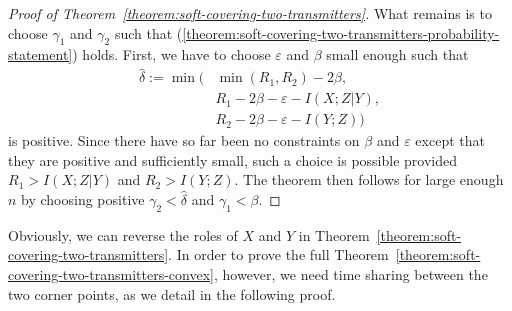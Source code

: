 \documentclass[journal]{IEEEtran}
\newcommand{\lemmaconst}{\delta}
\newcommand{\codebookRateOne}{R_1}
\newcommand{\codebookRateTwo}{R_2}
\newcommand{\channelInOne}{X}
\newcommand{\channelInTwo}{Y}
\newcommand{\channelOut}{Z}
\newcommand{\codebookBlocklength}{n}
\newcommand{\mutualInformation}[2]{I(#1;#2)}
\newcommand{\mutualInformationConditional}[3]{I(#1;#2|#3)}
\newcommand{\finalconstOne}{\gamma_1}
\newcommand{\finalconstTwo}{\gamma_2}
\newcommand{\proofconstantOne}{{\beta}}
\newcommand{\typicalityParam}{\varepsilon}
\begin{document}
\begin{proof}[Proof of Theorem~\ref{theorem:soft-covering-two-transmitters}]
What remains is to choose $\finalconstOne$ and $\finalconstTwo$ such that (\ref{theorem:soft-covering-two-transmitters-probability-statement}) holds. First, we have to choose $\typicalityParam$ and $\proofconstantOne$ small enough such that
\begin{align*}
\hat{\lemmaconst} := \min\big(
  &\min(\codebookRateOne,\codebookRateTwo)-2\proofconstantOne,
  \\
  &\codebookRateOne - 2\proofconstantOne - \typicalityParam - \mutualInformationConditional{\channelInOne}{\channelOut}{\channelInTwo},
  \\
  &\codebookRateTwo - 2\proofconstantOne - \typicalityParam - \mutualInformation{\channelInTwo}{\channelOut}
\big)
\end{align*}
is positive. Since there have so far been no constraints on $\proofconstantOne$ and $\typicalityParam$ except that they are positive and sufficiently small, such a choice is possible provided $\codebookRateOne > \mutualInformationConditional{\channelInOne}{\channelOut}{\channelInTwo}$ and $\codebookRateTwo > \mutualInformation{\channelInTwo}{\channelOut}$. The theorem then follows for large enough $\codebookBlocklength$ by choosing positive $\finalconstTwo < \hat{\lemmaconst}$ and $\finalconstOne < \proofconstantOne$.
\end{proof}

Obviously, we can reverse the roles of $\channelInOne$ and $\channelInTwo$ in Theorem~\ref{theorem:soft-covering-two-transmitters}. In order to prove the full Theorem~\ref{theorem:soft-covering-two-transmitters-convex}, however, we need time sharing between the two corner points, as we detail in the following proof.
\end{document}
